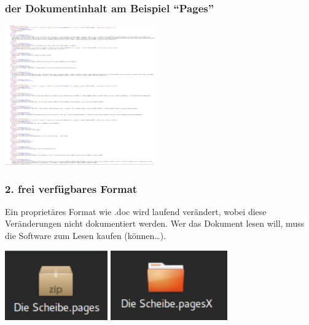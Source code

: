  \begin{frame}
    \frametitle{der Dokumentinhalt am Beispiel ``Pages''}
      \begin{center}
        \includegraphics[height=6cm]{pics/der_eigentliche_text.png}
      \end{center}
  \end{frame}


  \begin{frame}
  \frametitle{2. frei verfügbares Format}
    Ein proprietäres Format wie .doc wird laufend verändert, wobei diese Veränderungen nicht dokumentiert werden. Wer das Dokument lesen will, muss die Software zum Lesen kaufen (können\ldots).

    \includegraphics[height=3cm]{pics/pages-2011} \hfill \includegraphics[height=3cm]{pics/pages-2013}
  \end{frame}

